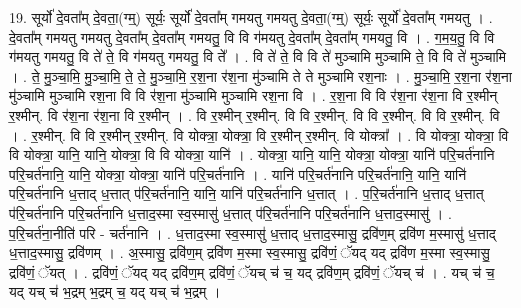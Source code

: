 \documentclass[17pt]{extarticle}
\begin{document}
19. सूर्यो॑ दे॒वता᳚म् दे॒वता॒(ग्म्॒) सूर्यः॒ सूर्यो॑ दे॒वता᳚म् गमयतु गमयतु दे॒वता॒(ग्म्॒) सूर्यः॒ सूर्यो॑ दे॒वता᳚म् गमयतु । . दे॒वता᳚म् गमयतु गमयतु दे॒वता᳚म् दे॒वता᳚म् गमयतु॒ वि वि ग॑मयतु दे॒वता᳚म् दे॒वता᳚म् गमयतु॒ वि । . ग॒म॒य॒तु॒ वि वि ग॑मयतु गमयतु॒ वि ते॑ ते॒ वि ग॑मयतु गमयतु॒ वि ते᳚ । . वि ते॑ ते॒ वि वि ते॑ मुञ्चामि मुञ्चामि ते॒ वि वि ते॑ मुञ्चामि । . ते॒ मु॒ञ्चा॒मि॒ मु॒ञ्चा॒मि॒ ते॒ ते॒ मु॒ञ्चा॒मि॒ र॒श॒ना र॑श॒ना मु॑ञ्चामि ते ते मुञ्चामि रश॒नाः । . मु॒ञ्चा॒मि॒ र॒श॒ना र॑श॒ना मु॑ञ्चामि मुञ्चामि रश॒ना वि वि र॑श॒ना मु॑ञ्चामि मुञ्चामि रश॒ना वि । . र॒श॒ना वि वि र॑श॒ना र॑श॒ना वि र॒श्मीन् र॒श्मीन्. वि र॑श॒ना र॑श॒ना वि र॒श्मीन् । . वि र॒श्मीन् र॒श्मीन्. वि वि र॒श्मीन्. वि वि र॒श्मीन्. वि वि र॒श्मीन्. वि । . र॒श्मीन्. वि वि र॒श्मीन् र॒श्मीन्. वि योक्त्रा॒ योक्त्रा॒ वि र॒श्मीन् र॒श्मीन्. वि योक्त्रा᳚ । . वि योक्त्रा॒ योक्त्रा॒ वि वि योक्त्रा॒ यानि॒ यानि॒ योक्त्रा॒ वि वि योक्त्रा॒ यानि॑ । . योक्त्रा॒ यानि॒ यानि॒ योक्त्रा॒ योक्त्रा॒ यानि॑ परि॒चर्त॑नानि परि॒चर्त॑नानि॒ यानि॒ योक्त्रा॒ योक्त्रा॒ यानि॑ परि॒चर्त॑नानि । . यानि॑ परि॒चर्त॑नानि परि॒चर्त॑नानि॒ यानि॒ यानि॑ परि॒चर्त॑नानि ध॒त्ताद् ध॒त्तात् प॑रि॒चर्त॑नानि॒ यानि॒ यानि॑ परि॒चर्त॑नानि ध॒त्तात् । . प॒रि॒चर्त॑नानि ध॒त्ताद् ध॒त्तात् प॑रि॒चर्त॑नानि परि॒चर्त॑नानि ध॒त्ताद॒स्मा स्व॒स्मासु॑ ध॒त्तात् प॑रि॒चर्त॑नानि परि॒चर्त॑नानि ध॒त्ताद॒स्मासु॑ । . प॒रि॒चर्त॑ना॒नीति॑ परि - चर्त॑नानि । . ध॒त्ताद॒स्मा स्व॒स्मासु॑ ध॒त्ताद् ध॒त्ताद॒स्मासु॒ द्रवि॑ण॒म् द्रवि॑ण म॒स्मासु॑ ध॒त्ताद् ध॒त्ताद॒स्मासु॒ द्रवि॑णम् । . अ॒स्मासु॒ द्रवि॑ण॒म् द्रवि॑ण म॒स्मा स्व॒स्मासु॒ द्रवि॑णं॒ ॅयद् यद् द्रवि॑ण म॒स्मा स्व॒स्मासु॒ द्रवि॑णं॒ ॅयत् । . द्रवि॑णं॒ ॅयद् यद् द्रवि॑ण॒म् द्रवि॑णं॒ ॅयच् च॑ च॒ यद् द्रवि॑ण॒म् द्रवि॑णं॒ ॅयच् च॑ । . यच् च॑ च॒ यद् यच् च॑ भ॒द्रम् भ॒द्रम् च॒ यद् यच् च॑ भ॒द्रम् । \newline
\end{document}

